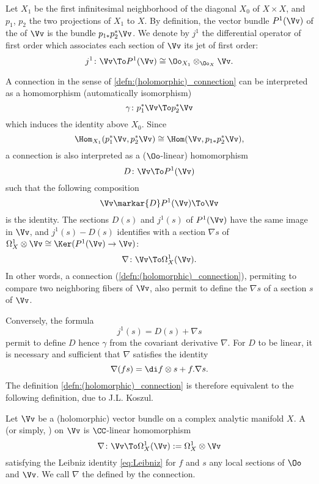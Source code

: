 \begin{para}
  Let $X_1$ be the first infinitesimal neighborhood of the diagonal $X_0$ of
  $X\times X$, and $p_1$, $p_2$ the two projections of $X_1$ to $X$.
  By definition, the vector bundle $P^1(\Vv)$ of the  of $\Vv$ is the bundle $p_{1\ast}p_2^{\ast}\Vv$.
  We denote by $j^1$ the differential operator of first order which associates
  each section of $\Vv$ its jet of first order:
  \[
  j^1\colon\Vv\To P^1(\Vv)\cong\Oo_{X_1}\otimes_{\Oo_X}\Vv.
  \]

  A connection in the sense of \ref{defn:(holomorphic)_connection} can be
  interpreted as a homomorphism (automatically isomorphism)
  \[
  \gamma\colon p_1^{\ast}\Vv\To p_2^{\ast}\Vv
  \]
  which induces the identity above $X_0$. Since
  \[
  \Hom_{X_1}(p_1^{\ast}\Vv,p_2^{\ast}\Vv) \cong
  \Hom(\Vv,p_{1\ast}p_2^{\ast}\Vv),
  \]
  a connection is also interpreted as a ($\Oo$-linear) homomorphism
  \[
  D\colon\Vv\To P^1(\Vv)
  \]
  such that the following composition
  \[
  \Vv\markar{D}P^1(\Vv)\To\Vv
  \]
  is the identity.
  The sections $D(s)$ and $j^1(s)$ of $P^1(\Vv)$ have the same image in $\Vv$,
  and $j^1(s)-D(s)$ identifies with a section $\nabla s$ of
  $\Omega_X^1\otimes\Vv\cong\Ker(P^1(\Vv)\to\Vv)$:
  \[
  \nabla\colon\Vv\To\Omega_X^1(\Vv).
  \]
  In other words, a connection (\ref{defn:(holomorphic)_connection}),
  permiting to compare two neighboring fibers of $\Vv$,
  also permit to define the  $\nabla s$ of a section $s$ of
  $\Vv$.

  Conversely, the formula
  \begin{equation}
    j^1(s) = D(s) + \nabla s
  \end{equation}
  permit to define $D$ hence $\gamma$ from the covariant derivative $\nabla$.
  For $D$ to be linear, it is necessary and sufficient that $\nabla$ satisfies
  the identity
  \begin{equation}\label{eq:Leibniz}
    \nabla(fs) = \di f\otimes s + f.\nabla s.
  \end{equation}
  The definition \ref{defn:(holomorphic)_connection} is therefore equivalent to
  the following definition, due to J.L. Koszul.
\end{para}
\begin{definition}\label{defn:holomorphic_connection}
  Let $\Vv$ be a (holomorphic) vector bundle on a complex analytic manifold $X$.
  A  (or simply, ) on $\Vv$ is
  $\CC$-linear homomorphism
  \[
  \nabla\colon\Vv\To\Omega_X^1(\Vv):=\Omega_X^1\otimes\Vv
  \]
  satisfying the Leibniz identity \cref{eq:Leibniz} for $f$ and $s$ any local
  sections of $\Oo$ and $\Vv$.
  We call $\nabla$ the  defined by the connection.
\end{definition}

